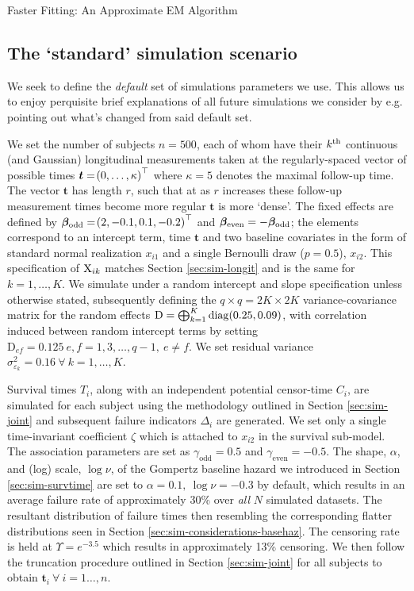 \begin{chapter}{\label{cha:approx}Faster Fitting: An Approximate EM Algorithm}
  \subsection{The `standard' simulation scenario}\label{sec:approx-simsetup-proper}
  We seek to define the \textit{default} set of simulations parameters we use. This allows us to enjoy perquisite brief explanations of all future simulations we consider by e.g. pointing out what's changed from said default set. 
  
  We set the number of subjects $n=500$, each of whom have their $k^{\text{th}}$ continuous (and Gaussian) longitudinal measurements taken at the regularly-spaced vector of possible times $\bm{t}=\!\left(0,\dots,\kappa\right)^\top$ where $\kappa=5$ denotes the maximal follow-up time. The vector $\bm{t}$ has length $r$, such that at as $r$ increases these follow-up measurement times become more regular \ie $\bm{t}$ is more `dense'. The fixed effects are defined by $\bm{\beta}_{\mathrm{odd}}=\!\left(2, -0.1, 0.1, -0.2\right)^\top$ and $\bm{\beta}_{\mathrm{even}}=-\bm{\beta}_{\mathrm{odd}}$; the elements correspond to an intercept term, time $\bm{t}$ and two baseline covariates in the form of standard normal realization $x_{i1}$ and a single Bernoulli draw ($p=0.5$), $x_{i2}$. This specification of $\mathrm{X}_{ik}$ matches Section \ref{sec:sim-longit} and is the same for $k=1,\dots,K$. We simulate under a random intercept and slope specification unless otherwise stated, subsequently defining the $q\times q = 2K\times2K$ variance-covariance matrix for the random effects $\mathrm{D} = \bigoplus_{k=1}^K \mathrm{diag}\!\left(0.25, 0.09\right)$, with correlation induced between random intercept terms by setting $\mathrm{D}_{ef}=0.125\ e,f=1, 3, \dots, q-1,\ e\neq f$. We set residual variance $\sigma^2_{\varepsilon_k}=0.16\ \forall\ k=1,\dots,K$.

  Survival times $T_i$, along with an independent potential censor-time $C_i$, are simulated for each subject using the methodology outlined in Section \ref{sec:sim-joint} and subsequent failure indicators $\Delta_i$ are generated. We set only a single time-invariant coefficient $\zeta$ which is attached to $x_{i2}$ in the survival sub-model. The association parameters are set as $\gamma_{\mathrm{odd}}=0.5$ and $\gamma_\mathrm{even}=-0.5$. The shape, $\alpha$, and (log) scale, $\log\nu$, of the Gompertz baseline hazard we introduced in Section \ref{sec:sim-survtime} are set to $\alpha=0.1,\ \log\nu=-0.3$ by default, which results in an average failure rate of approximately 30\% over \textit{all} $N$ simulated datasets. The resultant distribution of failure times then resembling the corresponding flatter distributions seen in Section \ref{sec:sim-considerations-basehaz}. The censoring rate is held at $\Upsilon=e^{-3.5}$ which results in approximately 13\% censoring. We then follow the truncation procedure outlined in Section \ref{sec:sim-joint} for all subjects to obtain $\bm{t}_i\ \forall\ i=1\dots,n$.


\end{chapter}
